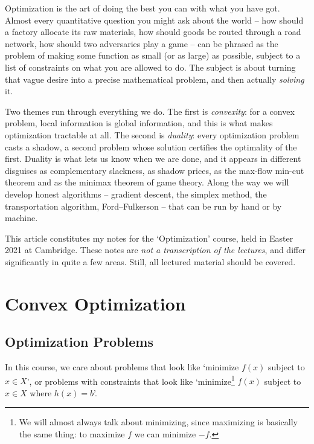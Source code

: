 



Optimization is the art of doing the best you can with what you have got. Almost every quantitative question you might ask about the world -- how should a factory allocate its raw materials, how should goods be routed through a road network, how should two adversaries play a game -- can be phrased as the problem of making some function as small (or as large) as possible, subject to a list of constraints on what you are allowed to do. The subject is about turning that vague desire into a precise mathematical problem, and then actually \emph{solving} it.

Two themes run through everything we do. The first is \emph{convexity}: for a convex problem, local information is global information, and this is what makes optimization tractable at all. The second is \emph{duality}: every optimization problem casts a shadow, a second problem whose solution certifies the optimality of the first. Duality is what lets us know when we are done, and it appears in different disguises as complementary slackness, as shadow prices, as the max-flow min-cut theorem and as the minimax theorem of game theory. Along the way we will develop honest algorithms -- gradient descent, the simplex method, the transportation algorithm, Ford--Fulkerson -- that can be run by hand or by machine.

This article constitutes my notes for the `Optimization' course, held in Easter 2021 at Cambridge. These notes are \emph{not a transcription of the lectures}, and differ significantly in quite a few areas. Still, all lectured material should be covered.



\section{Convex Optimization}

\subsection{Optimization Problems}

In this course, we care about problems that look like `minimize $f(x)$ subject to $x \in X$', or problems with constraints that look like `minimize\footnote{We will almost always talk about minimizing, since maximizing is basically the same thing: to maximize $f$ we can minimize $-f$.} $f(x)$ subject to $x \in X$ where $h(x) = b$'.

